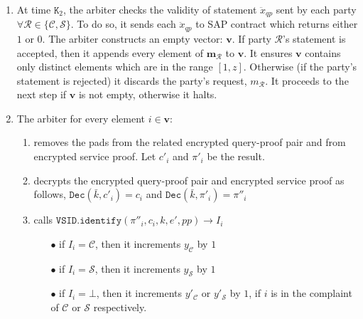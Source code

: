 \begin{enumerate}
\begin{enumerate}
 

\item\label{arbiter-checks-statement} At time $\texttt{K}_{\scriptscriptstyle 2}$, the arbiter checks the validity of  statement $\ddot{x}_{\scriptscriptstyle qp}$ sent by each party  $\forall \mathcal R\in \{\mathcal {C,S}\}$. To  do so, it sends  each $\ddot{x}_{\scriptscriptstyle qp}$ to SAP contract which  returns  either $1$ or $0$. The arbiter  constructs an empty vector: $\bm{v}$.  If  party $\mathcal R$'s statement is accepted, then 
 it appends every  element of $\bm{m}_{\scriptscriptstyle\mathcal{R}}$ to $\bm{v}$. It ensures $\bm{v}$ contains only distinct elements which are in the range $[1,z]$. Otherwise (if the party's statement is rejected) it discards the party's request, ${m}_{\scriptscriptstyle\mathcal{R}}$. It proceeds to the next step if $\bm{v}$ is not empty, otherwise it halts. 






\item\label{the-arbiter-loop} The arbiter  for every element $i\in\bm{v}$:

\begin{enumerate}

 
\item removes the pads from the related encrypted    query-proof pair  and from encrypted service proof. Let $c'_{\scriptscriptstyle i}$ and $\pi'_{\scriptscriptstyle i}$ be the result. %
\item decrypts the encrypted query-proof pair and encrypted service proof as follows, $ \mathtt{Dec}(\bar{k},c'_{\scriptscriptstyle i})=c_{\scriptscriptstyle i}$ and 
$ \mathtt{Dec}(\bar{k},\pi'_{\scriptscriptstyle i})=\pi''_{\scriptscriptstyle i}$ 
\item\label{arbiter-identify} calls   $\mathtt{VSID.identify}(\pi''_{\scriptscriptstyle i},c_{\scriptscriptstyle i}, k, e', {pp})\rightarrow I_{\scriptscriptstyle i}$
\begin{enumerate}
\item[$\bullet$] if $I_{\scriptscriptstyle i}=\mathcal C$, then it increments $y_{\scriptscriptstyle\mathcal C}$ by $1$ 
\item[$\bullet$]  if $I_{\scriptscriptstyle i}=\mathcal S$, then it increments $y_{\scriptscriptstyle\mathcal S}$ by $1$ 
\item[$\bullet$]  if $I_{\scriptscriptstyle i}=\bot$, then it increments  $y'_{\scriptscriptstyle\mathcal C}$ or $y'_{\scriptscriptstyle\mathcal S}$ by $1$, if $i$ is in  the complaint of $\mathcal {C}$ or $\mathcal {S}$ respectively. 
\end{enumerate}
\end{enumerate}


\end{enumerate}
\end{enumerate}
